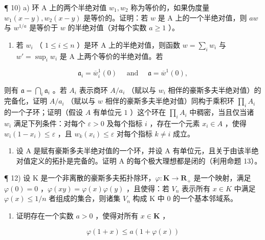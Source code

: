¶ 10) a) 环 A 上的两个半绝对值 \(w_1, w_2\) 称为等价的，如果伪度量 \(w_1(x - y), w_2(x - y)\) 是等价的。证明：若 \(w\) 是 A 上的一个半绝对值，则 \(aw\) 与 \(w^{1/a}\) 是等价于 \(w\) 的半绝对值（对每个实数 \(a \geqslant 1\) ）。

\begin{enumerate}
\def\labelenumi{\alph{enumi})}
\setcounter{enumi}{1}
\tightlist
\item
  若 \(w_{i}\) （ \(1 \leqslant i \leqslant n\) ）是环 A 上的半绝对值，则函数 \(w = \sum_{i} w_{i}\) 与 \(w' = \sup_{i} w_{i}\) 是 A 上两个等价的半绝对值。若
\end{enumerate}

\[
\mathfrak {a} _ {i} = \overline {{{w}}} _ {i} ^ {1} (\mathrm{0}) \quad \text { and } \quad \mathfrak {a} = \overline {{{w}}} ^ {1} (\mathrm{0}),
\]

则有 \(\mathfrak{a} = \bigcap_{i} \mathfrak{a}_{i}\) 。若 \(A_i\) 表示商环 \(A/a_i\) （赋以与 \(w_i\) 相伴的豪斯多夫半绝对值）的完备化，证明 \(A/a_i\) （赋以与 \(w\) 相伴的豪斯多夫半绝对值）同构于乘积环 \(\prod_{i} A_i\) 的一个子环；证明（假设 \(A\) 有单位元 \(1\) ）这个环在 \(\prod_{i} A_i\) 中稠密，当且仅当诸 \(w_i\) 满足下列条件：对每个 \(\varepsilon > 0\) 及每个指标 \(i\) ，存在一个元素 \(x_i \in A\) ，使得 \(w_i(1 - x_i) \leqslant \varepsilon\) ，且 \(w_k(x_i) \leqslant \varepsilon\) 对每个指标 \(k \neq i\) 成立。

\begin{enumerate}
\def\labelenumi{\arabic{enumi})}
\setcounter{enumi}{10}
\tightlist
\item
  设 A 是赋有豪斯多夫半绝对值的一个环，并设 A 有单位元，且关于由该半绝对值定义的拓扑是完备的。证明 A 的每个极大理想都是闭的（利用命题 13）。
\end{enumerate}

¶ 12) 设 K 是一个非离散的豪斯多夫拓扑除环，\(\varphi: \mathbf{K} \to \mathbf{R}_{+}\) 是一个映射，满足 \(\varphi(0) = 0\) ，\(\varphi(xy) = \varphi(x)\varphi(y)\) ，且使得：若 \(V_{n}\) 表示所有 \(x \in K\) 中满足 \(\varphi(x) \leqslant 1/n\) 者组成的集合，则诸集 \(V_{n}\) 构成 K 中 \(0\) 的一个基本邻域系。

\begin{enumerate}
\def\labelenumi{\alph{enumi})}
\tightlist
\item
  证明存在一个实数 \(a > 0\) ，使得对所有 \(x \in \mathbf{K}\) ，
\end{enumerate}

\[
\varphi (1 + x) \leqslant a (1 + \varphi (x))
\]

